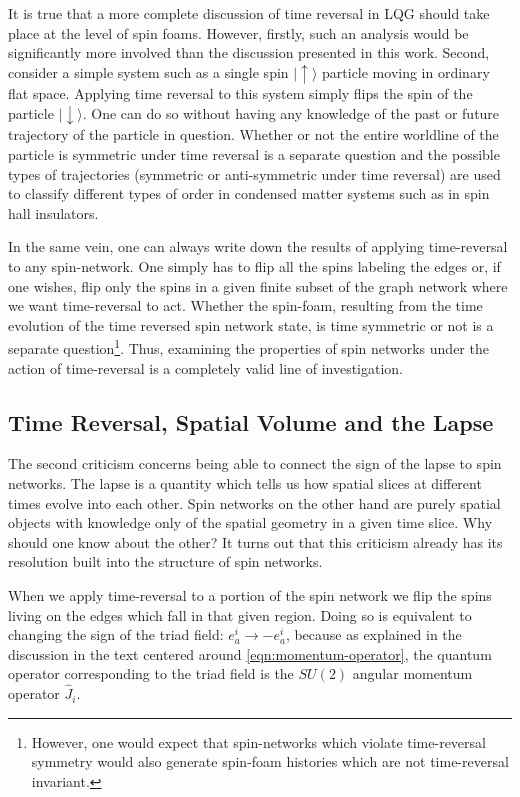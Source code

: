 \documentclass[preprint]{SciPost}
\newcommand{\ket}[1]{\vert #1 \rangle}
\theoremstyle{plain} %
\begin{document}
It is true that a more complete discussion of time reversal in LQG should take place at the level of spin foams. However, firstly, such an analysis would be significantly more involved than the discussion presented in this work. Second, consider a simple system such as a single spin $ \ket{\uparrow} $ particle moving in ordinary flat space. Applying time reversal to this system simply flips the spin of the particle $ \ket{\downarrow} $. One can do so without having any knowledge of the past or future trajectory of the particle in question. Whether or not the entire worldline of the particle is symmetric under time reversal is a separate question and the possible types of trajectories (symmetric or anti-symmetric under time reversal) are used to classify different types of order in condensed matter systems such as in spin hall insulators.

In the same vein, one can always write down the results of applying time-reversal to any spin-network. One simply has to flip all the spins labeling the edges or, if one wishes, flip only the spins in a given finite subset of the graph network where we want time-reversal to act. Whether the spin-foam, resulting from the time evolution of the time reversed spin network state, is time symmetric or not is a separate question\footnote{However, one would expect that spin-networks which violate time-reversal symmetry would also generate spin-foam histories which are not time-reversal invariant.}. Thus, examining the properties of spin networks under the action of time-reversal is a completely valid line of investigation.

\subsection{Time Reversal, Spatial Volume and the Lapse}

The second criticism concerns being able to connect the sign of the lapse to spin networks. The lapse is a quantity which tells us how spatial slices at different times evolve into each other. Spin networks on the other hand are purely spatial objects with knowledge only of the spatial geometry in a given time slice. Why should one know about the other? It turns out that this criticism already has its resolution built into the structure of spin networks.

When we apply time-reversal to a portion of the spin network we flip the spins living on the edges which fall in that given region. Doing so is equivalent to changing the sign of the triad field: $ e_a^i \rightarrow - e_a^i $, because as explained in the discussion in the text centered around \eqref{eqn:momentum-operator}, the quantum operator corresponding to the triad field is the $ SU(2) $ angular momentum operator $ \hat J_i $.
\end{document}
